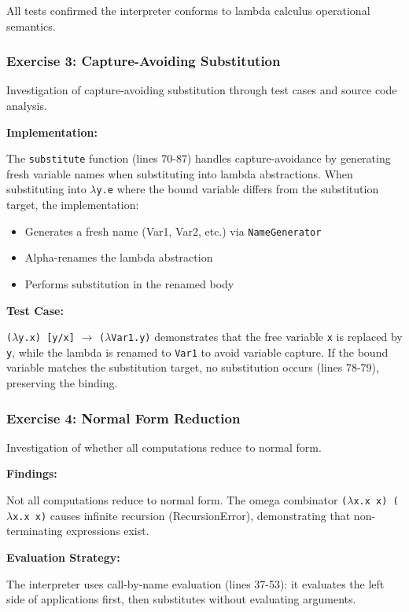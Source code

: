 \documentclass{article}
\theoremstyle{theorem}
\theoremstyle{definition}
\theoremstyle{remark}
\begin{document}
All tests confirmed the interpreter conforms to lambda calculus operational semantics.

\subsubsection{Exercise 3: Capture-Avoiding Substitution}

Investigation of capture-avoiding substitution through test cases and source code analysis.

\textbf{Implementation:}

The \texttt{substitute} function (lines 70-87) handles capture-avoidance by generating fresh variable names when substituting into lambda abstractions. When substituting into \texttt{$\lambda$y.e} where the bound variable differs from the substitution target, the implementation:
\begin{itemize}
\item Generates a fresh name (Var1, Var2, etc.) via \texttt{NameGenerator}
\item Alpha-renames the lambda abstraction
\item Performs substitution in the renamed body
\end{itemize}

\textbf{Test Case:}

\texttt{($\lambda$y.x) [y/x]} $\to$ \texttt{($\lambda$Var1.y)} demonstrates that the free variable \texttt{x} is replaced by \texttt{y}, while the lambda is renamed to \texttt{Var1} to avoid variable capture. If the bound variable matches the substitution target, no substitution occurs (lines 78-79), preserving the binding.

\subsubsection{Exercise 4: Normal Form Reduction}

Investigation of whether all computations reduce to normal form.

\textbf{Findings:}

Not all computations reduce to normal form. The omega combinator \texttt{($\lambda$x.x x) ($\lambda$x.x x)} causes infinite recursion (RecursionError), demonstrating that non-terminating expressions exist.

\textbf{Evaluation Strategy:}

The interpreter uses call-by-name evaluation (lines 37-53): it evaluates the left side of applications first, then substitutes without evaluating arguments. 
\end{document}
